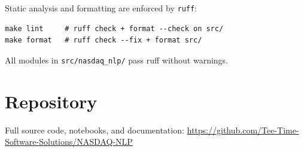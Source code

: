 \documentclass[12pt,a4paper]{article}
\begin{document}
Static analysis and formatting are enforced by \texttt{ruff}:
\begin{verbatim}
make lint     # ruff check + format --check on src/
make format   # ruff check --fix + format src/
\end{verbatim}

All modules in \texttt{src/nasdaq\_nlp/} pass ruff without warnings.

\section{Repository}

Full source code, notebooks, and documentation:
\url{https://github.com/Tee-Time-Software-Solutions/NASDAQ-NLP}
\end{document}
